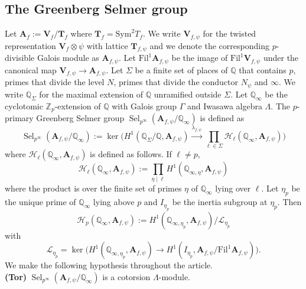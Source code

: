 \documentclass{amsart}
\newcommand{\Fil}{\mathrm{Fil}}
\newcommand{\Q}{\mathbb{Q}}
\newcommand{\Z}{\mathbb{Z}}
\newcommand{\bV}{\mathbf{V}}
\newcommand{\bT}{\mathbf{T}}
\newcommand{\bA}{\mathbf{A}}
\newcommand{\Sel}{\operatorname{Sel}}
\newtheorem{auxiliary proposition}[theorem]{Auxiliary Proposition}
\newtheorem{main conjecture}[theorem]{Main Conjecture}
\newtheorem{main theorem}[theorem]{Main Theorem}
\newtheorem{modesty proposition}[theorem]{Modesty Proposition}
\newtheorem{open problem}[theorem]{Open Problem}
\newtheorem{convergence lemma}[theorem]{Convergence Lemma}
\newtheorem{corrected lemma}[theorem]{Corrected Lemma}
\newtheorem{growth lemma}[theorem]{Growth Lemma}
\newtheorem{coefficient lemma}[theorem]{Integrality Lemma}
\newtheorem{interpolation lemma}[theorem]{Interpolation Lemma}
\newtheorem{kernel lemma}[theorem]{Kernel Lemma}
\newtheorem{limit lemma}[theorem]{Limit Lemma}
\newtheorem{tandem lemma}[theorem]{Modesty Lemma}
\newtheorem{zero-finding lemma}[theorem]{Zero-Finding Lemma}
\begin{document}
\subsection{The Greenberg Selmer group}\label{sec:notation}
Let $\bA_f:=\bV_f/\bT_f $ where $\bT_f=\mathrm{Sym}^2T_f$. We write $\bV_{f, \psi}$ for the twisted representation $\bV_f \otimes \psi$ with lattice $\bT_{f, \psi}$ and we denote the corresponding $p$-divisible Galois module as $\bA_{f, \psi}$.
Let $\Fil^1 \bA_{f, \psi}$ be the image of $\Fil^1 \bV_{f, \psi}$ under the canonical map $\bV_{f, \psi} \rightarrow \bA_{f, \psi}$.
Let $\Sigma$ be  a finite set of places of $\Q$ that contains $p$, primes that divide the level $N$, primes that divide the conductor $N_\psi$ and  $\infty$. We write $\Q_\Sigma$ for the maximal extension of $\Q$ unramified outside $\Sigma$. Let $\Q_\infty$ be the cyclotomic $\Z_p$-extension of $\Q$ with Galois group $\Gamma$ and Iwasawa algebra $\Lambda$. 
The $p$-primary Greenberg Selmer group 
$\Sel_{p^\infty}(\bA_{f, \psi}/\Q_\infty)$ is defined as 
$$\Sel_{p^\infty}(\bA_{f, \psi}/\Q_\infty):=\ker \Big(H^1(\Q_{\Sigma}/\Q,\bA_{f, \psi}) \xrightarrow{\lambda_{f, \psi}} \prod_{\ell \in \Sigma}\mathcal{H}_{\ell}(\Q_\infty, \bA_{f, \psi})\Big)$$
where $\mathcal{H}_{\ell}(\Q_\infty, \bA_{f, \psi})$ is defined as follows. If $\ell \neq p$, 
$$\mathcal{H}_{\ell}(\Q_\infty, \bA_{f, \psi}):= \prod_{\eta \mid \ell} H^1(\Q_{\infty, \eta}, \bA_{f, \psi})$$
where the product is over the finite set of primes $\eta$ of $\Q_\infty$ lying over $\ell$. Let $\eta_p$ be the unique prime of $\Q_\infty$ lying above $p$ and $I_{\eta_p}$ be the inertia subgroup at $\eta_p$. Then $$\mathcal{H}_p(\Q_\infty, \bA_{f, \psi}):=H^1(\Q_{\infty, \eta_p}, \bA_{f, \psi})/\mathcal{L}_{\eta_p}$$ with 
$$\mathcal{L}_{\eta_p}=\ker\Big(H^1(\Q_{\infty,\eta_p}, \bA_{f, \psi}) \longrightarrow H^1(I_{\eta_p}, \bA_{f, \psi}/\Fil^1 \bA_{f, \psi})\Big).$$
We make the following hypothesis throughout the article. 
\\

\noindent \textbf{(Tor)} $\Sel_{p^\infty}(\bA_{f, \psi}/\Q_\infty)$ is a cotorsion $\Lambda$-module.
\vspace{.2cm}
\end{document}
